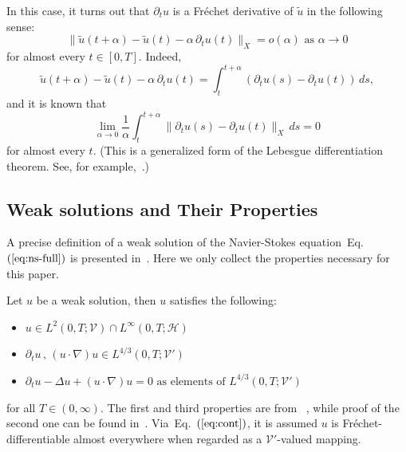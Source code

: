 \documentclass{article}
\def\eq#1{Eq.~$(\ref{#1})$}
\def\H{{\mathcal{H}}}
\def\V{{\mathcal{V}}}
\begin{document}
In this case, it turns out that $\partial_t u$ is a Fr\'echet derivative of $\tilde u$ in the following sense:
\begin{equation}
\label{eq:frechet}
\lVert \tilde u(t+\alpha)- \tilde u(t) - \alpha \,
\partial_t u(t) \rVert_X = o(\alpha) \text{ as } \alpha \to 0
\end{equation}
for almost every $t \in [0,T]$. Indeed,
\begin{equation*}
  \tilde u(t+\alpha) - \tilde u(t) - \alpha \,\partial_t u(t)
   = \int_{t}^{t+\alpha}(\partial_t u(s) - \partial_t u(t))\,ds,
\end{equation*}
and it is known that 
\begin{equation*}
    \lim\limits_{\alpha \to 0}\frac{1}{\alpha}\int_{t}^{t+\alpha} \lVert \partial_t u(s) - \partial_t u(t) \rVert_X \,ds =0
\end{equation*}
for almost every $t$.
(This is a generalized form of the Lebesgue differentiation theorem. See, for
example,~\cite[Thm~3.4]{DanEnr23}.)


\subsection{Weak solutions and Their Properties}
\label{sec:weak}
A precise definition of a weak solution of the Navier-Stokes
  equation~\eq{eq:ns-full} is presented in~\cite[Chapter~3]{RobRodSad16}. Here we only collect the properties necessary for this paper. 

  Let $u$ be a weak solution, then $u$ satisfies the following:
\begin{itemize}
    \item $u \in L^2(0,T; \mathcal{V}) \cap L^\infty(0,T; \H)$ 
    \item $ \partial_t u \,  , \, (u \cdot \nabla)u  \in L^{4/3}(0,T ; \mathcal{V}')$ 
    \item $ \partial_t u -\Delta u + (u \cdot \nabla)u = 0 \text{ as elements of } L^{4/3}(0,T ; \V')$
\end{itemize}
for all $T \in (0,\infty)$. The first and third properties are from ~\cite[Definition~3.3]{RobRodSad16}, while proof of the second one can be found in~\cite[Lemma~3.4 and Lemma~3.7]{RobRodSad16}. Via~\eq{eq:cont}, it is assumed $u$ is Fr\'echet-differentiable almost everywhere when regarded as a $\V'$-valued mapping.

  

 

 
\end{document}
